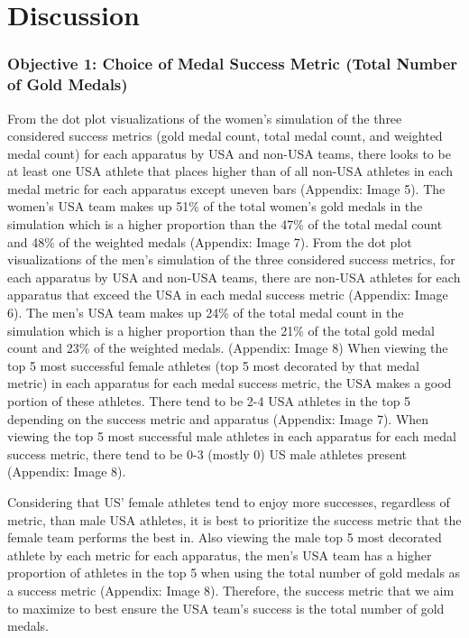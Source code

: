 \documentclass[
  10.5pt,
  letterpaper,
  DIV=11,
  numbers=noendperiod]{scrartcl}
\begin{document}
\hypertarget{discussion}{%
\section{Discussion}\label{discussion}}

\hypertarget{objective-1-choice-of-medal-success-metric-total-number-of-gold-medals}{%
\subsubsection{Objective 1: Choice of Medal Success Metric (Total Number
of Gold
Medals)}\label{objective-1-choice-of-medal-success-metric-total-number-of-gold-medals}}

From the dot plot visualizations of the women's simulation of the three
considered success metrics (gold medal count, total medal count, and
weighted medal count) for each apparatus by USA and non-USA teams, there
looks to be at least one USA athlete that places higher than of all
non-USA athletes in each medal metric for each apparatus except uneven
bars (Appendix: Image 5). The women's USA team makes up 51\% of the
total women's gold medals in the simulation which is a higher proportion
than the 47\% of the total medal count and 48\% of the weighted medals
(Appendix: Image 7). From the dot plot visualizations of the men's
simulation of the three considered success metrics, for each apparatus
by USA and non-USA teams, there are non-USA athletes for each apparatus
that exceed the USA in each medal success metric (Appendix: Image 6).
The men's USA team makes up 24\% of the total medal count in the
simulation which is a higher proportion than the 21\% of the total gold
medal count and 23\% of the weighted medals. (Appendix: Image 8) When
viewing the top 5 most successful female athletes (top 5 most decorated
by that medal metric) in each apparatus for each medal success metric,
the USA makes a good portion of these athletes. There tend to be 2-4 USA
athletes in the top 5 depending on the success metric and apparatus
(Appendix: Image 7). When viewing the top 5 most successful male
athletes in each apparatus for each medal success metric, there tend to
be 0-3 (mostly 0) US male athletes present (Appendix: Image 8).

Considering that US' female athletes tend to enjoy more successes,
regardless of metric, than male USA athletes, it is best to prioritize
the success metric that the female team performs the best in. Also
viewing the male top 5 most decorated athlete by each metric for each
apparatus, the men's USA team has a higher proportion of athletes in the
top 5 when using the total number of gold medals as a success metric
(Appendix: Image 8). Therefore, the success metric that we aim to
maximize to best ensure the USA team's success is the total number of
gold medals.
\end{document}
